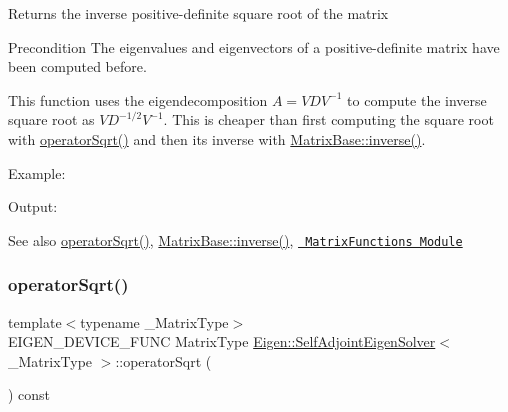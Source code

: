 \begin{DoxyReturn}{Returns}
the inverse positive-\/definite square root of the matrix
\end{DoxyReturn}
\begin{DoxyPrecond}{Precondition}
The eigenvalues and eigenvectors of a positive-\/definite matrix have been computed before.
\end{DoxyPrecond}
This function uses the eigendecomposition $ A = V D V^{-1} $ to compute the inverse square root as $ V D^{-1/2} V^{-1} $. This is cheaper than first computing the square root with \mbox{\hyperlink{class_eigen_1_1_self_adjoint_eigen_solver_a5c5158fd86366081bdabec38112c2c8a}{operator\+Sqrt()}} and then its inverse with \mbox{\hyperlink{class_eigen_1_1_matrix_base_a7712eb69e8ea3c8f7b8da1c44dbdeebf}{Matrix\+Base\+::inverse()}}.

Example\+: 
\begin{DoxyCodeInclude}{0}
\end{DoxyCodeInclude}
 Output\+: 
\begin{DoxyVerbInclude}
\end{DoxyVerbInclude}


\begin{DoxySeeAlso}{See also}
\mbox{\hyperlink{class_eigen_1_1_self_adjoint_eigen_solver_a5c5158fd86366081bdabec38112c2c8a}{operator\+Sqrt()}}, \mbox{\hyperlink{class_eigen_1_1_matrix_base_a7712eb69e8ea3c8f7b8da1c44dbdeebf}{Matrix\+Base\+::inverse()}}, \href{unsupported/group__MatrixFunctions__Module.html}{\texttt{ Matrix\+Functions Module}} 
\end{DoxySeeAlso}
\mbox{\label{class_eigen_1_1_self_adjoint_eigen_solver_a5c5158fd86366081bdabec38112c2c8a}} 
\subsubsection{\texorpdfstring{operatorSqrt()}{operatorSqrt()}}
{\footnotesize\ttfamily template$<$typename \+\_\+\+Matrix\+Type$>$ \\
E\+I\+G\+E\+N\+\_\+\+D\+E\+V\+I\+C\+E\+\_\+\+F\+U\+NC Matrix\+Type \mbox{\hyperlink{class_eigen_1_1_self_adjoint_eigen_solver}{Eigen\+::\+Self\+Adjoint\+Eigen\+Solver}}$<$ \+\_\+\+Matrix\+Type $>$\+::operator\+Sqrt (\begin{DoxyParamCaption}{ }\end{DoxyParamCaption}) const\hspace{0.3cm}{\ttfamily [inline]}}



